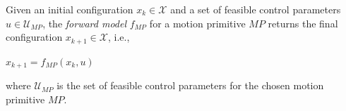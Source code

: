 \begin{definition}\label{def:forward-model}

Given an initial configuration $x_k \in \mathcal{X}$ and a set of feasible control parameters $u \in \mathcal{U}_{MP}$, the \textsl{forward model} $f_{MP}$ for a motion primitive $MP$ returns the final configuration $x_{k+1} \in \mathcal{X}$, i.e.,

\begin{center}
$x_{k+1} = f_{MP}(x_k, u)$
\end{center}
\end{definition}

where $\mathcal{U}_{MP}$ is the set of feasible control parameters for the chosen motion primitive $MP$.
